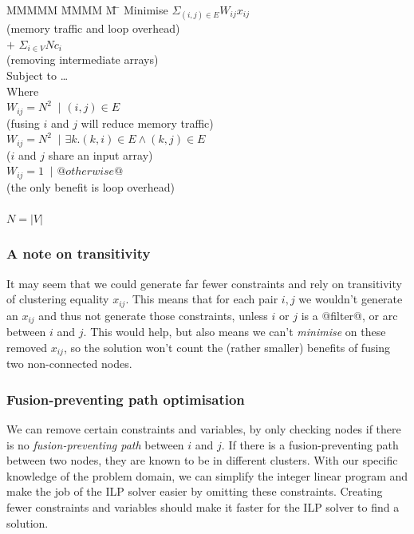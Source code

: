 \begin{tabbing}
MMMMM   \= MMMM \= M \= \kill
Minimise   \>     \> $\Sigma_{(i,j) \in E} W_{ij} x_{ij}$   \\
           \> \> \> (memory traffic and loop overhead)         \\
           \> $+$ \> $\Sigma_{i \in V} N c_i$  \\
           \> \> \> (removing intermediate arrays)         \\
Subject to \> \ldots                                \\
Where      \>                                       \\
           \> $W_{ij} = N^2$ \> $~|$ \> $(i,j) \in E $         \\
           \> \> \> (fusing $i$ and $j$ will reduce memory traffic)         \\
           \> $W_{ij} = N^2$ \> $~|$ \> $\exists k. (k,i) \in E \wedge (k,j) \in E $     \\
           \> \> \> ($i$ and $j$ share an input array)                                         \\
           \> $W_{ij} = 1$   \> $~|$ \> $@otherwise@$                                                  \\
           \> \> \> (the only benefit is loop overhead)                                        \\
           \\
           \> $N = |V|$
\end{tabbing}


\subsubsection{A note on transitivity}
It may seem that we could generate far fewer constraints and rely on transitivity of clustering equality $x_{ij}$.
This means that for each pair $i,j$ we wouldn't generate an $x_{ij}$ and thus not generate those constraints, unless $i$ or $j$ is a @filter@, or arc between $i$ and $j$.
This would help, but also means we can't \emph{minimise} on these removed $x_{ij}$, so the solution won't count the (rather smaller) benefits of fusing two non-connected nodes.

\subsubsection{Fusion-preventing path optimisation}
\label{s:OptimisedConstraints}
We can remove certain constraints and variables, by only checking nodes if there is no \emph{fusion-preventing path} between $i$ and $j$.
If there is a fusion-preventing path between two nodes, they are known to be in different clusters.
With our specific knowledge of the problem domain, we can simplify the integer linear program and make the job of the ILP solver easier by omitting these constraints.
Creating fewer constraints and variables should make it faster for the ILP solver to find a solution.

